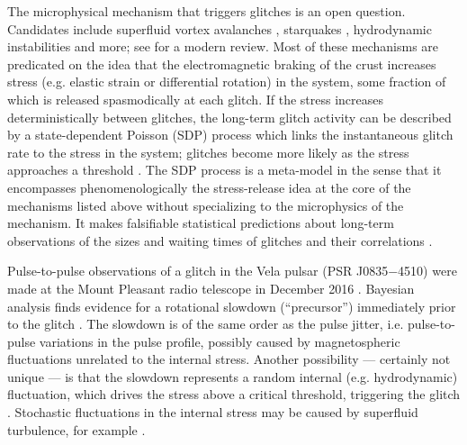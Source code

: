 The microphysical mechanism that triggers glitches is an open question. Candidates include superfluid vortex avalanches \citep{Anderson1975, Warszawski2011}, starquakes \citep{Larson2002, Middleditch2006}, hydrodynamic instabilities \citep{Andersson2003, Mastrano2005, Glampedakis2009} and more; see \citet{Haskell2015} for a modern review. Most of these mechanisms are predicated on the idea that the electromagnetic braking of the crust increases stress (e.g. elastic strain or differential rotation) in the system, some fraction of which is released spasmodically at each glitch. If the stress increases deterministically between glitches, the long-term glitch activity can be described by a state-dependent Poisson (SDP) process which links the instantaneous glitch rate to the stress in the system; glitches become more likely as the stress approaches a threshold \citep{Fulgenzi2017}. The SDP process is a meta-model in the sense that it encompasses phenomenologically the stress-release idea at the core of the mechanisms listed above without specializing to the microphysics of the mechanism. It makes falsifiable statistical predictions about long-term observations of the sizes and waiting times of glitches and their correlations \citep{Fulgenzi2017, Melatos2018,Carlin2019quasi,Carlin2019ac}. 

Pulse-to-pulse observations of a glitch in the Vela pulsar (PSR J0835$-$4510) were made at the Mount Pleasant radio telescope in December 2016 \citep{Palfreyman2018}. Bayesian analysis finds evidence for a rotational slowdown (``precursor'') immediately prior to the glitch \citep{Ashton2019}. The slowdown is of the same order as the pulse jitter, i.e. pulse-to-pulse variations in the pulse profile, possibly caused by magnetospheric fluctuations unrelated to the internal stress. Another possibility --- certainly not unique --- is that the slowdown represents a random internal (e.g. hydrodynamic) fluctuation, which drives the stress above a critical threshold, triggering the glitch \citep{Ashton2019}. Stochastic fluctuations in the internal stress may be caused by superfluid turbulence, for example \citep{Melatos2007,Melatos2014,Khomenko2019}. 

